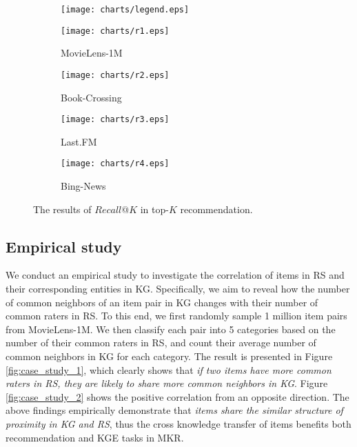 \documentclass[sigconf]{acmart}
\begin{document}
        \begin{figure*}[t]
			\centering
			\begin{subfigure}[b]{0.95\textwidth}
                \texttt{[image: charts/legend.eps]}
                \vspace{-0.15in}
            \end{subfigure}
            \hfill
            \begin{subfigure}[b]{0.24\textwidth}
                \texttt{[image: charts/r1.eps]}
                \caption{MovieLens-1M}
            \end{subfigure}
            \hfill
            \begin{subfigure}[b]{0.24\textwidth}
                \texttt{[image: charts/r2.eps]}
                \caption{Book-Crossing}
            \end{subfigure}
            \hfill
            \begin{subfigure}[b]{0.24\textwidth}
                \texttt{[image: charts/r3.eps]}
                \caption{Last.FM}
            \end{subfigure}
            \hfill
            \begin{subfigure}[b]{0.24\textwidth}
                \texttt{[image: charts/r4.eps]}
                \caption{Bing-News}
            \end{subfigure}
            \caption{The results of $Recall@K$ in top-$K$ recommendation.}
            \label{fig:recall}
        \end{figure*}	
	
	
	\subsection{Empirical study}        
		We conduct an empirical study to investigate the correlation of items in RS and their corresponding entities in KG.
		Specifically, we aim to reveal how the number of common neighbors of an item pair in KG changes with their number of common raters in RS.
		To this end, we first randomly sample 1 million item pairs from MovieLens-1M.
		We then classify each pair into 5 categories based on the number of their common raters in RS, and count their average number of common neighbors in KG for each category.
		The result is presented in Figure \ref{fig:case_study_1}, which clearly shows that \textit{if two items have more common raters in RS, they are likely to share more common neighbors in KG}.
		Figure \ref{fig:case_study_2} shows the positive correlation from an opposite direction.
		The above findings empirically demonstrate that \textit{items share the similar structure of proximity in KG and RS}, thus the cross knowledge transfer of items benefits both recommendation and KGE tasks in MKR.
		
\end{document}
